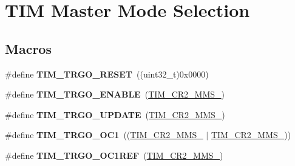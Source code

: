 \hypertarget{group___t_i_m___master___mode___selection}{\section{T\-I\-M Master Mode Selection}
\label{group___t_i_m___master___mode___selection}
}
\subsection*{Macros}
\begin{DoxyCompactItemize}
\item 
\hypertarget{group___t_i_m___master___mode___selection_ga32a8e436f2c0818a657b0d3fcf4e872d}{\#define {\bfseries T\-I\-M\-\_\-\-T\-R\-G\-O\-\_\-\-R\-E\-S\-E\-T}~((uint32\-\_\-t)0x0000)}\label{group___t_i_m___master___mode___selection_ga32a8e436f2c0818a657b0d3fcf4e872d}

\item 
\hypertarget{group___t_i_m___master___mode___selection_ga4ac300b0fd24d1e6532e5961680a39a9}{\#define {\bfseries T\-I\-M\-\_\-\-T\-R\-G\-O\-\_\-\-E\-N\-A\-B\-L\-E}~(\hyperlink{group___peripheral___registers___bits___definition_gaf3e55308e84106d6501201e66bd46ab6}{T\-I\-M\-\_\-\-C\-R2\-\_\-\-M\-M\-S\-\_})}\label{group___t_i_m___master___mode___selection_ga4ac300b0fd24d1e6532e5961680a39a9}

\item 
\hypertarget{group___t_i_m___master___mode___selection_ga27521aebd507e562fe7fba6dfc639a67}{\#define {\bfseries T\-I\-M\-\_\-\-T\-R\-G\-O\-\_\-\-U\-P\-D\-A\-T\-E}~(\hyperlink{group___peripheral___registers___bits___definition_ga4b1036929b0a4ba5bd5cced9b8e0f4c3}{T\-I\-M\-\_\-\-C\-R2\-\_\-\-M\-M\-S\-\_})}\label{group___t_i_m___master___mode___selection_ga27521aebd507e562fe7fba6dfc639a67}

\item 
\hypertarget{group___t_i_m___master___mode___selection_ga80aa9a9c41de509d99fc4cb492d6513f}{\#define {\bfseries T\-I\-M\-\_\-\-T\-R\-G\-O\-\_\-\-O\-C1}~((\hyperlink{group___peripheral___registers___bits___definition_ga4b1036929b0a4ba5bd5cced9b8e0f4c3}{T\-I\-M\-\_\-\-C\-R2\-\_\-\-M\-M\-S\-\_} $\vert$ \hyperlink{group___peripheral___registers___bits___definition_gaf3e55308e84106d6501201e66bd46ab6}{T\-I\-M\-\_\-\-C\-R2\-\_\-\-M\-M\-S\-\_}))}\label{group___t_i_m___master___mode___selection_ga80aa9a9c41de509d99fc4cb492d6513f}

\item 
\hypertarget{group___t_i_m___master___mode___selection_gaed715aa7ec4ad0f7f5d82dde6d964178}{\#define {\bfseries T\-I\-M\-\_\-\-T\-R\-G\-O\-\_\-\-O\-C1\-R\-E\-F}~(\hyperlink{group___peripheral___registers___bits___definition_gacb74a815afdd856d51cfcf1ddf3fce6a}{T\-I\-M\-\_\-\-C\-R2\-\_\-\-M\-M\-S\-\_})}\label{group___t_i_m___master___mode___selection_gaed715aa7ec4ad0f7f5d82dde6d964178}


\end{DoxyCompactItemize}

